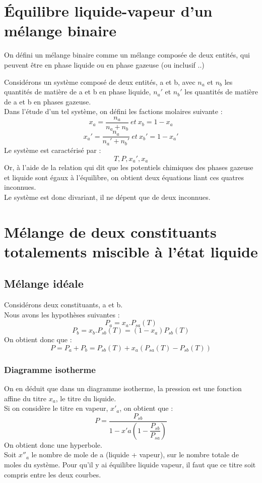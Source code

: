 \section{Équilibre liquide-vapeur d'un mélange binaire}
\begin{de}
On défini un mélange binaire comme un mélange composée de deux entités, qui peuvent être en phase liquide ou en phase gazeuse (ou inclusif ..)
\end{de}
Considérons un système composé de deux entités, a et b, avec $n_a$ et $n_b$ les quantités de matière de a et b en phase liquide, $n_a'$ et $n_b'$ les quantités de matière de a et b en phases gazeuse.\\
Dans l'étude d'un tel système, on défini les factions molaires suivante : 
$$x_a = \dfrac{n_a}{n_a + n_b}~ et~ x_b = 1 -x_a$$
$$x_a' = \dfrac{n_a}{n_a' + n_b'}~ et~ x_b' = 1 -x_a'$$
Le système est caractérisé par :
$$T,P,x_a',x_a$$
Or, à l'aide de la relation qui dit que les potentiels chimiques des phases gazeuse et liquide sont égaux à l'équilibre, on obtient deux équations liant ces quatres inconnues.\\
Le système est donc divariant, il ne dépent que de deux inconnues.
\section{Mélange de deux constituants totalements miscible à l'état liquide}
\subsection{Mélange idéale}
Considérons deux constituants, a et b.\\
Nous avons les hypothèses suivantes : 
$$P_a = x_a.P_{sa}(T)$$
$$P_b = x_b.P_{sb}(T) = (1-x_a)P_{sb}(T)$$
On obtient donc que : 
$$P = P_a+P_b = P_{sb}(T) + x_a(P_{sa}(T)-P_{sb}(T))$$
\subsubsection{Diagramme isotherme}
On en déduit que dans un diagramme isotherme, la pression est une fonction affine du titre $x_a$, le titre du liquide.\\
Si on considère le titre en vapeur, $x'_a$, on obtient que : 
$$P = \dfrac{P_{sb}}{1-x'a(1-\dfrac{P_{sb}}{P_{sa}})}$$
On obtient donc une hyperbole.\\
Soit $x''_a$ le nombre de mole de a (liquide + vapeur), sur le nombre totale de moles du système. Pour qu'il y ai équilibre liquide vapeur, il faut que ce titre soit compris entre les deux courbes.
